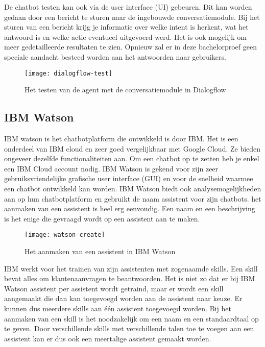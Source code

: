 De chatbot testen kan ook via de user interface (UI) gebeuren. Dit kan worden gedaan door een bericht te sturen naar de ingebouwde conversatiemodule. Bij het sturen van een bericht krijg je informatie over welke intent is herkent, wat het antwoord is en welke actie eventueel uitgevoerd werd. Het is ook mogelijk om meer gedetailleerde resultaten te zien. Opnieuw zal er in deze bachelorproef geen speciale aandacht besteed worden aan het antwoorden naar gebruikers.

\begin{figure}[H]
    \label{fig:dialogflow-test}
    \centering
    \texttt{[image: dialogflow-test]}
    \caption{Het testen van de agent met de conversatiemodule in Dialogflow}
\end{figure}

\subsection{IBM Watson}
\label{subsec:werking-platformen-ibm-watson}

IBM watson is het chatbotplatform die ontwikkeld is door IBM. Het is een onderdeel van IBM cloud en zeer goed vergelijkbaar met Google Cloud. Ze bieden ongeveer dezelfde functionaliteiten aan. Om een chatbot op te zetten heb je enkel een IBM Cloud account nodig. IBM Watson is gekend voor zijn zeer gebruiksvriendelijke grafische user interface (GUI) en voor de snelheid waarmee een chatbot ontwikkeld kan worden. IBM Watson biedt ook analysemogelijkheden aan op hun chatbotplatform en gebruikt de naam assistent voor zijn chatbots. het aanmaken van een assistent is heel erg eenvoudig. Een naam en een beschrijving is het enige die gevraagd wordt op een assistent aan te maken.

\begin{figure}[H]
    \label{fig:watson-create}
    \centering
    \texttt{[image: watson-create]}
    \caption{Het aanmaken van een assistent in IBM Watson}
\end{figure}

IBM werkt voor het trainen van zijn assistenten met zogenaamde skills. Een skill bevat alles om klantenaanvragen te beantwoorden. Het is niet zo dat er bij IBM Watson assistent per assistent wordt getraind, maar er wordt een skill aangemaakt die dan kan toegevoegd worden aan de assistent naar keuze. Er kunnen dus meerdere skills aan één assistent toegevoegd worden. Bij het aanmaken van een skill is het noodzakelijk om een naam en een standaardtaal op te geven. Door verschillende skills met verschillende talen toe te voegen aan een assistent kan er dus ook een meertalige assistent gemaakt worden.

